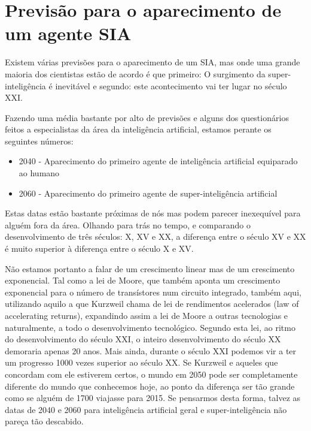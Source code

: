 \documentclass[runningheads,a4paper]{llncs}
\begin{document}
\section{Previsão para o aparecimento de um agente SIA}

Existem várias previsões para o aparecimento de um SIA, mas onde uma grande maioria dos cientistas estão de acordo é que primeiro: O surgimento da super-inteligência é inevitável e segundo: este acontecimento vai ter lugar no século XXI\@.

Fazendo uma média bastante por alto de previsões e alguns dos questionários feitos a especialistas da área da inteligência artificial, estamos perante os seguintes números:

\begin{itemize}

  \item 2040 - Aparecimento do primeiro agente de inteligência artificial equiparado ao humano
  \item 2060 - Aparecimento do primeiro agente de super-inteligência artificial

\end{itemize}

Estas datas estão bastante próximas de nós mas podem parecer inexequível para alguém fora da área. Olhando para trás no tempo, e comparando o desenvolvimento de três séculos: X, XV e XX, a diferença entre o século XV e XX é muito superior à diferença entre o século X e XV\@.

Não estamos portanto a falar de um crescimento linear mas de um crescimento exponencial. Tal como a lei de Moore, que também aponta um crescimento exponencial para o número de transístores num circuito integrado, também aqui, utilizando aquilo a que Kurzweil chama de lei de rendimentos acelerados
(law of accelerating returns), expandindo assim a lei de Moore a outras tecnologias e naturalmente, a todo o desenvolvimento tecnológico. Segundo esta lei, ao ritmo do desenvolvimento do século XXI, o inteiro desenvolvimento do século XX demoraria apenas 20 anos. Mais ainda, durante o século XXI podemos vir a ter um progresso 1000 vezes superior ao século XX\@. Se Kurzweil e aqueles que concordam com ele estiverem certos, o mundo em 2050 pode ser completamente diferente do mundo que conhecemos hoje, ao ponto da diferença ser tão grande como se alguém de 1700 viajasse para 2015. Se pensarmos desta forma, talvez as datas de 2040 e 2060 para inteligência artificial geral e super-inteligência não pareça tão descabido.
\end{document}
